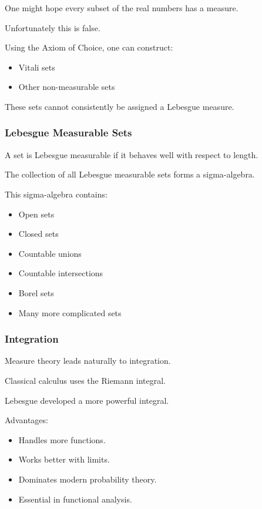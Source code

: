\documentclass[11pt]{article}
\begin{document}
One might hope every subset of the real numbers has a measure.

Unfortunately this is false.

Using the Axiom of Choice, one can construct:

\begin{itemize}
\item Vitali sets
\item Other non-measurable sets
\end{itemize}

These sets cannot consistently be assigned a Lebesgue measure.
\subsubsection{Lebesgue Measurable Sets}
\label{sec:org2d87f70}

A set is Lebesgue measurable if it behaves well with respect to length.

The collection of all Lebesgue measurable sets forms a sigma-algebra.

This sigma-algebra contains:

\begin{itemize}
\item Open sets
\item Closed sets
\item Countable unions
\item Countable intersections
\item Borel sets
\item Many more complicated sets
\end{itemize}
\subsubsection{Integration}
\label{sec:org91528cb}

Measure theory leads naturally to integration.

Classical calculus uses the Riemann integral.

Lebesgue developed a more powerful integral.

Advantages:

\begin{itemize}
\item Handles more functions.
\item Works better with limits.
\item Dominates modern probability theory.
\item Essential in functional analysis.
\end{itemize}
\end{document}
